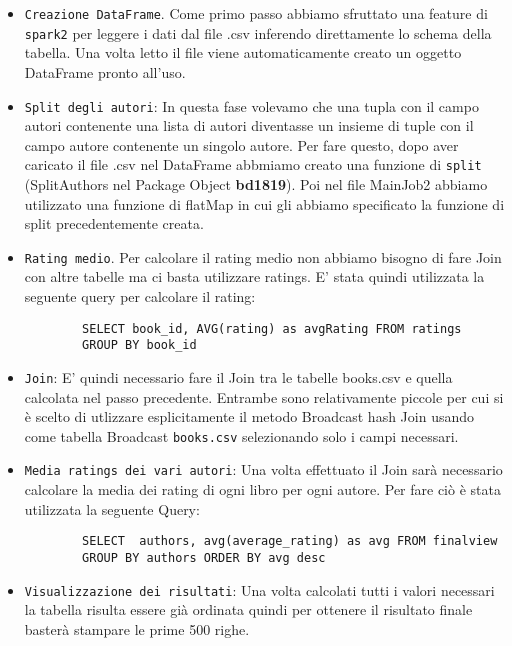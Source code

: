 \begin{itemize}
    \item \texttt{Creazione DataFrame}. Come primo passo abbiamo sfruttato una feature di \texttt{spark2} per leggere
    i dati dal file .csv inferendo direttamente lo schema della tabella. Una volta letto il file viene automaticamente creato
    un oggetto DataFrame pronto all'uso.
    \item \texttt{Split degli autori}: In questa fase volevamo che una tupla con il campo autori contenente una lista di autori diventasse
    un insieme di tuple con il campo autore contenente un singolo autore. Per fare questo, dopo aver caricato il file .csv nel DataFrame
    abbmiamo creato una funzione di \texttt{split} (SplitAuthors nel Package Object \textbf{bd1819}). Poi nel file MainJob2 abbiamo utilizzato una funzione di
    flatMap in cui gli abbiamo specificato la funzione di split precedentemente creata.
    \item  \texttt{Rating medio}. Per calcolare il rating medio non abbiamo bisogno di fare Join con altre tabelle ma ci basta utilizzare
    ratings. E' stata quindi utilizzata la seguente query per calcolare il rating:
    \begin{verbatim}
        SELECT book_id, AVG(rating) as avgRating FROM ratings
        GROUP BY book_id
    \end{verbatim}
    \item \texttt{Join}: E' quindi necessario fare il Join tra le tabelle books.csv e quella calcolata nel passo precedente. Entrambe sono relativamente piccole
    per cui si è scelto di utlizzare esplicitamente il metodo Broadcast hash Join usando come tabella Broadcast \texttt{books.csv} selezionando solo i campi necessari.
    \item \texttt{Media ratings dei vari autori}: Una volta effettuato il Join sarà necessario calcolare la media dei rating di ogni libro per ogni autore. Per fare ciò
    è stata utilizzata la seguente Query:
    \begin{verbatim}
        SELECT  authors, avg(average_rating) as avg FROM finalview
        GROUP BY authors ORDER BY avg desc
    \end{verbatim}
    \item \texttt{Visualizzazione dei risultati}: Una volta calcolati tutti i valori necessari la tabella risulta essere già ordinata quindi per ottenere il risultato finale
    basterà stampare le prime 500 righe.
\end{itemize}

